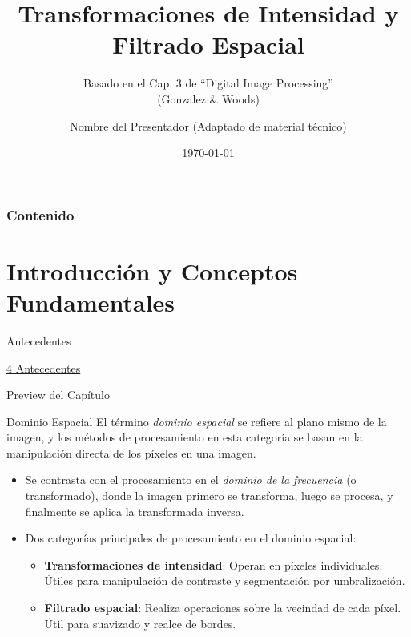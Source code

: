 \documentclass{beamer}
\title{Transformaciones de Intensidad y Filtrado Espacial}
\subtitle{Basado en el Cap. 3 de ``Digital Image Processing'' \\ (Gonzalez \& Woods)}
\author{Nombre del Presentador  \small{(Adaptado de material técnico)}}
\institute{Universidad / Institución}
\date{\today}
\begin{document}
\begin{frame}
    \titlepage
\end{frame}

\begin{frame}
    \frametitle{Contenido}
    \tableofcontents
\end{frame}

\section{Introducción y Conceptos Fundamentales}

\begin{frame}[fragile]{Antecedentes}

\href{run:Antecedentes.html}{4 Antecedentes}

\end{frame}



\begin{frame}{Preview del Capítulo}
    \begin{block}{Dominio Espacial}
        El término \textit{dominio espacial} se refiere al plano mismo de la imagen, y los métodos de procesamiento en esta categoría se basan en la manipulación directa de los píxeles en una imagen.
    \end{block}
    \begin{itemize}
        \item Se contrasta con el procesamiento en el \textit{dominio de la frecuencia} (o transformado), donde la imagen primero se transforma, luego se procesa, y finalmente se aplica la transformada inversa.
        \item Dos categorías principales de procesamiento en el dominio espacial:
        \begin{itemize}
            \item \textbf{Transformaciones de intensidad}: Operan en píxeles individuales. Útiles para manipulación de contraste y segmentación por umbralización.
            \item \textbf{Filtrado espacial}: Realiza operaciones sobre la vecindad de cada píxel. Útil para suavizado y realce de bordes.
        \end{itemize}
    \end{itemize}
\end{frame}



\end{document}
